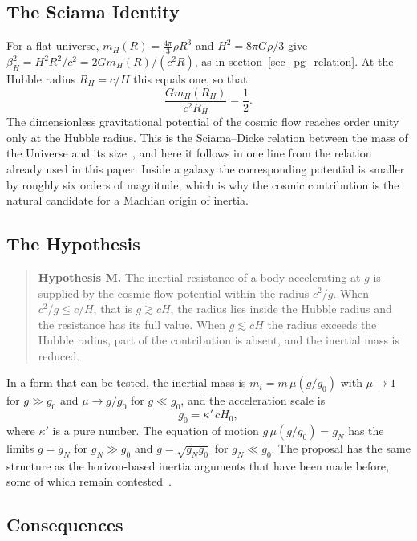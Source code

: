 \documentclass[pdflatex,sn-mathphys-num]{sn-jnl}%
\theoremstyle{thmstyleone}%
\theoremstyle{thmstyletwo}%
\theoremstyle{thmstylethree}%
\begin{document}
\subsection{The Sciama Identity}

For a flat universe, $m_H(R)=\tfrac{4\pi}{3}\rho R^{3}$ and $H^{2}=8\pi G\rho/3$ give $\beta_H^{2}=H^{2}R^{2}/c^{2}=2Gm_H(R)/(c^{2}R)$, as in section~\ref{sec_pg_relation}. At the Hubble radius $R_H=c/H$ this equals one, so that
\begin{equation}\label{eq_sciama}
    \frac{Gm_H(R_H)}{c^{2}R_H}=\frac{1}{2}.
\end{equation}
The dimensionless gravitational potential of the cosmic flow reaches order unity only at the Hubble radius. This is the Sciama--Dicke relation between the mass of the Universe and its size~\cite{Sciama1953}, and here it follows in one line from the relation already used in this paper. Inside a galaxy the corresponding potential is smaller by roughly six orders of magnitude, which is why the cosmic contribution is the natural candidate for a Machian origin of inertia.

\subsection{The Hypothesis}

\begin{quote}
\textbf{Hypothesis M.} The inertial resistance of a body accelerating at $g$ is supplied by the cosmic flow potential within the radius $c^{2}/g$. When $c^{2}/g\le c/H$, that is $g\gtrsim cH$, the radius lies inside the Hubble radius and the resistance has its full value. When $g\lesssim cH$ the radius exceeds the Hubble radius, part of the contribution is absent, and the inertial mass is reduced.
\end{quote}

In a form that can be tested, the inertial mass is $m_i=m\,\mu(g/g_0)$ with $\mu\to1$ for $g\gg g_0$ and $\mu\to g/g_0$ for $g\ll g_0$, and the acceleration scale is
\begin{equation}\label{eq_g0}
    g_0=\kappa'\,cH_0,
\end{equation}
where $\kappa'$ is a pure number. The equation of motion $g\,\mu(g/g_0)=g_N$ has the limits $g=g_N$ for $g_N\gg g_0$ and $g=\sqrt{g_Ng_0}$ for $g_N\ll g_0$. The proposal has the same structure as the horizon-based inertia arguments that have been made before, some of which remain contested~\cite{McCulloch2007}.

\subsection{Consequences}
\end{document}
